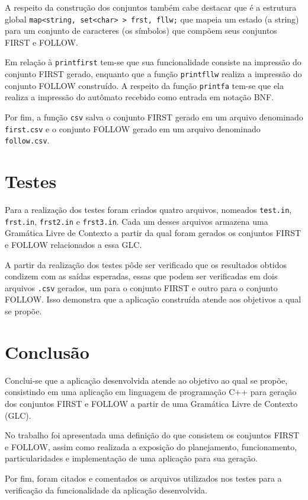 \documentclass[12pt]{article}
\theoremstyle{definition}
\begin{document}
A respeito da construção dos conjuntos também cabe destacar que é a estrutura global \texttt{map<string, set<char> > frst, fllw;} que mapeia um estado (a string) para um conjunto de caracteres (os símbolos) que compõem seus conjuntos FIRST e FOLLOW.

Em relação à \texttt{printfirst} tem-se que sua funcionalidade consiste na impressão do conjunto FIRST gerado, enquanto que a função \texttt{printfllw} realiza a impressão do conjunto FOLLOW construído. A respeito da função \texttt{printfa} tem-se que ela realiza a impressão do autômato recebido como entrada em notação BNF.

Por fim, a função \texttt{csv} salva o conjunto FIRST gerado em um arquivo denominado \texttt{first.csv} e o conjunto FOLLOW gerado em um arquivo denominado \texttt{follow.csv}.

\section{Testes}
\label{4}

Para a realização dos testes foram criados quatro arquivos, nomeados \texttt{test.in}, \texttt{frst.in}, \texttt{frst2.in} e \texttt{frst3.in}. Cada um desses arquivos armazena uma Gramática Livre de Contexto a partir da qual foram gerados os conjuntos FIRST e FOLLOW relacionados a essa GLC.

A partir da realização dos testes pôde ser verificado que os resultados obtidos condizem com as saídas esperadas, essas que podem ser verificadas em dois arquivos \texttt{.csv} gerados, um para o conjunto FIRST e outro para o conjunto FOLLOW. Isso demonstra que a aplicação construída atende aos objetivos a qual se propõe.

\section{Conclusão}
\label{5}

Conclui-se que a aplicação desenvolvida atende ao objetivo ao qual se propõe, consistindo em uma aplicação em linguagem de programação C++ para geração dos conjuntos FIRST e FOLLOW a partir de uma Gramática Livre de Contexto (GLC).

No trabalho foi apresentada uma definição do que consistem os conjuntos FIRST e FOLLOW, assim como realizada a exposição do planejamento, funcionamento, particularidades e implementação de uma aplicação para sua geração.

Por fim, foram citados e comentados os arquivos utilizados nos testes para a verificação da funcionalidade da aplicação desenvolvida.



\end{document}

